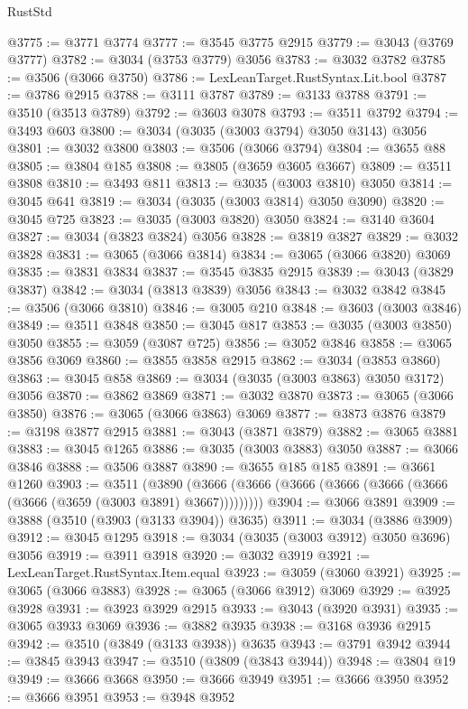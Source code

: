 \begin{lexlean}{RustStd}
\begin{coremodule}
@3775 := @3771 @3774
@3777 := @3545 @3775 @2915
@3779 := @3043 (@3769 @3777)
@3782 := @3034 (@3753 @3779) @3056
@3783 := @3032 @3782
@3785 := @3506 (@3066 @3750)
@3786 := LexLeanTarget.RustSyntax.Lit.bool
@3787 := @3786 @2915
@3788 := @3111 @3787
@3789 := @3133 @3788
@3791 := @3510 (@3513 @3789)
@3792 := @3603 @3078
@3793 := @3511 @3792
@3794 := @3493 @603
@3800 := @3034 (@3035 (@3003 @3794) @3050 @3143) @3056
@3801 := @3032 @3800
@3803 := @3506 (@3066 @3794)
@3804 := @3655 @88
@3805 := @3804 @185
@3808 := @3805 (@3659 @3605 @3667)
@3809 := @3511 @3808
@3810 := @3493 @811
@3813 := @3035 (@3003 @3810) @3050
@3814 := @3045 @641
@3819 := @3034 (@3035 (@3003 @3814) @3050 @3090)
@3820 := @3045 @725
@3823 := @3035 (@3003 @3820) @3050
@3824 := @3140 @3604
@3827 := @3034 (@3823 @3824) @3056
@3828 := @3819 @3827
@3829 := @3032 @3828
@3831 := @3065 (@3066 @3814)
@3834 := @3065 (@3066 @3820) @3069
@3835 := @3831 @3834
@3837 := @3545 @3835 @2915
@3839 := @3043 (@3829 @3837)
@3842 := @3034 (@3813 @3839) @3056
@3843 := @3032 @3842
@3845 := @3506 (@3066 @3810)
@3846 := @3005 @210
@3848 := @3603 (@3003 @3846)
@3849 := @3511 @3848
@3850 := @3045 @817
@3853 := @3035 (@3003 @3850) @3050
@3855 := @3059 (@3087 @725)
@3856 := @3052 @3846
@3858 := @3065 @3856 @3069
@3860 := @3855 @3858 @2915
@3862 := @3034 (@3853 @3860)
@3863 := @3045 @858
@3869 := @3034 (@3035 (@3003 @3863) @3050 @3172) @3056
@3870 := @3862 @3869
@3871 := @3032 @3870
@3873 := @3065 (@3066 @3850)
@3876 := @3065 (@3066 @3863) @3069
@3877 := @3873 @3876
@3879 := @3198 @3877 @2915
@3881 := @3043 (@3871 @3879)
@3882 := @3065 @3881
@3883 := @3045 @1265
@3886 := @3035 (@3003 @3883) @3050
@3887 := @3066 @3846
@3888 := @3506 @3887
@3890 := @3655 @185 @185
@3891 := @3661 @1260
@3903 := @3511
    (@3890 (@3666 (@3666 (@3666 (@3666 (@3666 (@3666 (@3666 (@3659 (@3003 @3891) @3667)))))))))
@3904 := @3066 @3891
@3909 := @3888 (@3510 (@3903 (@3133 @3904)) @3635)
@3911 := @3034 (@3886 @3909)
@3912 := @3045 @1295
@3918 := @3034 (@3035 (@3003 @3912) @3050 @3696) @3056
@3919 := @3911 @3918
@3920 := @3032 @3919
@3921 := LexLeanTarget.RustSyntax.Item.equal
@3923 := @3059 (@3060 @3921)
@3925 := @3065 (@3066 @3883)
@3928 := @3065 (@3066 @3912) @3069
@3929 := @3925 @3928
@3931 := @3923 @3929 @2915
@3933 := @3043 (@3920 @3931)
@3935 := @3065 @3933 @3069
@3936 := @3882 @3935
@3938 := @3168 @3936 @2915
@3942 := @3510 (@3849 (@3133 @3938)) @3635
@3943 := @3791 @3942
@3944 := @3845 @3943
@3947 := @3510 (@3809 (@3843 @3944))
@3948 := @3804 @19
@3949 := @3666 @3668
@3950 := @3666 @3949
@3951 := @3666 @3950
@3952 := @3666 @3951
@3953 := @3948 @3952

\end{coremodule}
\end{lexlean}

